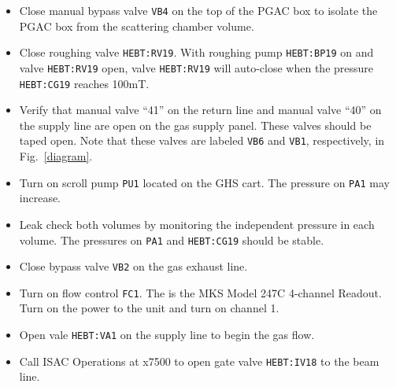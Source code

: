 \begin{itemize}
\setlength{\itemsep}{0pt}
\setlength{\parskip}{0pt}
\item %
Close manual bypass valve \texttt{VB4} on the top of the PGAC box to isolate the PGAC box from the scattering chamber volume.
\item Close roughing valve \texttt{HEBT:RV19}. With roughing pump \texttt{HEBT:BP19} on and valve \texttt{HEBT:RV19}  open, valve \texttt{HEBT:RV19} will auto-close when the pressure \texttt{HEBT:CG19} reaches 100mT.
\item Verify that manual valve ``41'' on the return line and manual valve  ``40'' on the supply line are open on the gas supply panel. These valves should be taped open.  Note that these valves are labeled \texttt{VB6} and \texttt{VB1}, respectively, in Fig.~\ref{diagram}.
\item Turn on scroll pump \texttt{PU1} located on the GHS cart. %
The pressure on \texttt{PA1} may increase.
\item Leak check both volumes by monitoring the independent pressure in each volume.  The pressures  on  \texttt{PA1} and \texttt{HEBT:CG19} should be stable.
\turboon
\item Close bypass valve \texttt{VB2} on the gas exhaust line. 
\item Turn on flow control \texttt{FC1}. The is the MKS Model 247C 4-channel Readout. Turn on the power to the unit and turn on channel 1.
\item Open vale \texttt{HEBT:VA1} on the supply line to begin the gas flow.
\pidset

\hvon
\item Call ISAC Operations at x7500 to open gate valve \texttt{HEBT:IV18} to the beam line.
\end{itemize}
